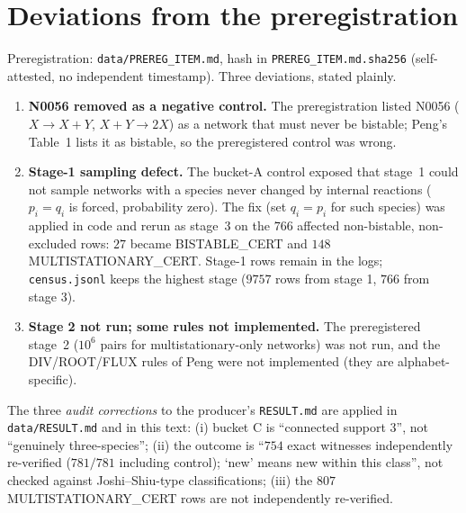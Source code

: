 \documentclass[11pt]{article}
\begin{document}
\section{Deviations from the preregistration}\label{sec:dev}
Preregistration: \texttt{data/PREREG\_ITEM.md}, hash in \texttt{PREREG\_ITEM.md.sha256} (self-attested, no independent timestamp). Three deviations, stated plainly.
\begin{enumerate}\itemsep=0pt
\item \textbf{N0056 removed as a negative control.} The preregistration listed N0056 ($X\to X{+}Y$, $X{+}Y\to2X$) as a network that must never be bistable; Peng's Table~1 lists it as bistable, so the preregistered control was wrong.
\item \textbf{Stage-1 sampling defect.} The bucket-A control exposed that stage~1 could not sample networks with a species never changed by internal reactions ($p_i=q_i$ is forced, probability zero). The fix (set $q_i=p_i$ for such species) was applied in code and rerun as stage~3 on the $766$ affected non-bistable, non-excluded rows: $27$ became BISTABLE\_CERT and $148$ MULTISTATIONARY\_CERT. Stage-1 rows remain in the logs; \texttt{census.jsonl} keeps the highest stage ($9757$ rows from stage 1, $766$ from stage 3).
\item \textbf{Stage 2 not run; some rules not implemented.} The preregistered stage~2 ($10^6$ pairs for multistationary-only networks) was not run, and the DIV/ROOT/FLUX rules of Peng were not implemented (they are alphabet-specific).
\end{enumerate}
The three \emph{audit corrections} to the producer's \texttt{RESULT.md} are applied in \texttt{data/RESULT.md} and in this text: (i) bucket C is ``connected support $3$'', not ``genuinely three-species''; (ii) the outcome is ``$754$ exact witnesses independently re-verified ($781/781$ including control); `new' means new within this class'', not checked against Joshi--Shiu-type classifications; (iii) the $807$ MULTISTATIONARY\_CERT rows are not independently re-verified.

\end{document}
